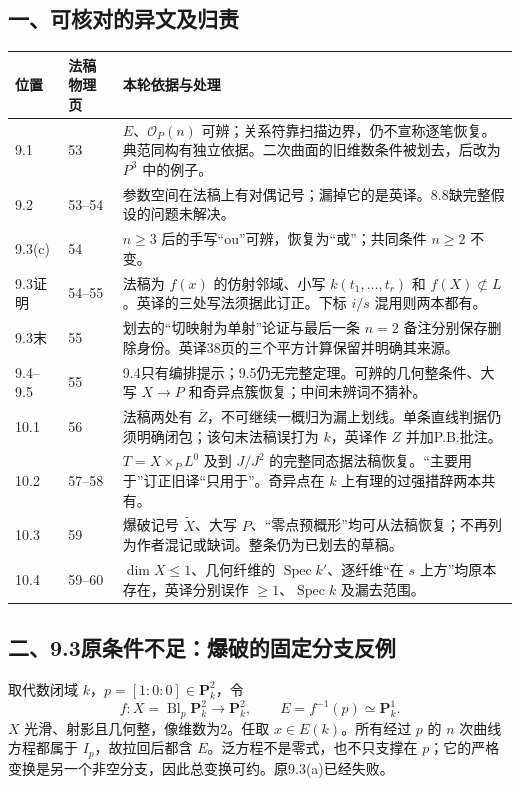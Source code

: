 \documentclass[UTF8,a4paper]{ctexbook}
\begin{document}
\subsection*{一、可核对的异文及归责}
\begin{longtable}{p{}p{}p{}}
\toprule
位置 & 法稿物理页 & 本轮依据与处理\\\midrule\endhead
9.1 & 53 & $E$、$\mathcal O_P(n)$ 可辨；关系符靠扫描边界，仍不宣称逐笔恢复。典范同构有独立依据。二次曲面的旧维数条件被划去，后改为 $P^3$ 中的例子。\\
9.2 & 53--54 & 参数空间在法稿上有对偶记号；漏掉它的是英译。8.8缺完整假设的问题未解决。\\
9.3(c) & 54 & $n\ge3$ 后的手写“ou”可辨，恢复为“或”；共同条件 $n\ge2$ 不变。\\
9.3证明 & 54--55 & 法稿为 $f(x)$ 的仿射邻域、小写 $k(t_1,\ldots,t_r)$ 和 $f(X)\not\subset L$。英译的三处写法须据此订正。下标 $i/s$ 混用则两本都有。\\
9.3末 & 55 & 划去的“切映射为单射”论证与最后一条 $n=2$ 备注分别保存删除身份。英译38页的三个平方计算保留并明确其来源。\\
9.4--9.5 & 55 & 9.4只有编排提示；9.5仍无完整定理。可辨的几何整条件、大写 $X\to P$ 和奇异点簇恢复；中间未辨词不猜补。\\
10.1 & 56 & 法稿两处有 $\overline Z$，不可继续一概归为漏上划线。单条直线判据仍须明确闭包；该句末法稿误打为 $k$，英译作 $Z$ 并加P.B.批注。\\
10.2 & 57--58 & $T=X\times_P L^0$ 及到 $J/J^2$ 的完整同态据法稿恢复。“主要用于”订正旧译“只用于”。奇异点在 $k$ 上有理的过强措辞两本共有。\\
10.3 & 59 & 爆破记号 $\widetilde X$、大写 $P$、“零点预概形”均可从法稿恢复；不再列为作者混记或缺词。整条仍为已划去的草稿。\\
10.4 & 59--60 & $\dim X\le1$、几何纤维的 $\operatorname{Spec}k'$、逐纤维“在 $s$ 上方”均原本存在，英译分别误作 $\ge1$、$\operatorname{Spec}k$ 及漏去范围。\\
\bottomrule
\end{longtable}

\subsection*{二、9.3原条件不足：爆破的固定分支反例}
取代数闭域 $k$，$p=[1:0:0]\in\mathbf P^2_k$，令
\[
 f:X=\operatorname{Bl}_p\mathbf P^2_k\longrightarrow\mathbf P^2_k,
 \qquad E=f^{-1}(p)\simeq\mathbf P^1_k.
\]
$X$ 光滑、射影且几何整，像维数为2。任取 $x\in E(k)$。所有经过 $p$ 的 $n$ 次曲线方程都属于 $I_p$，故拉回后都含 $E$。泛方程不是零式，也不只支撑在 $p$；它的严格变换是另一个非空分支，因此总变换可约。原9.3(a)已经失败。
\end{document}
